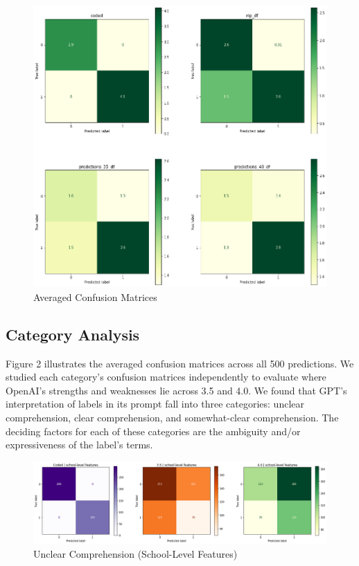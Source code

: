 \documentclass[12pt,a4paper]{article}
\begin{document}
\begin{figure}[H]
    \centering
    \includegraphics[width=1.0\linewidth]{avg_confusion_matrix_full.png}
    \caption{Averaged Confusion Matrices}
    \label{fig:enter-label}
\end{figure}


\subsection{Category Analysis}

\noindent Figure 2 illustrates the averaged confusion matrices across all 500 predictions. We studied each category's confusion matrices independently to evaluate where OpenAI's strengths and weaknesses lie across 3.5 and 4.0. We found that GPT's interpretation of labels in its prompt fall into three categories: unclear comprehension, clear comprehension, and somewhat-clear comprehension. The deciding factors for each of these categories are the ambiguity and/or expressiveness of the label's terms. \\

\begin{figure}[H]
    \centering
    \includegraphics[width=1\linewidth]{school_level_features_confusion.png}
    \caption{Unclear Comprehension (School-Level Features)}
    \label{fig:enter-label}
\end{figure}
\end{document}
